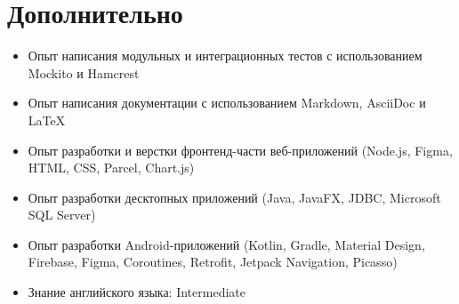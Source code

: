 \documentclass[letterpaper,11pt]{report}
\newcommand{\bulletItem}[1]{\item[$\bullet$] #1}
\begin{document}
\section{Дополнительно}

\begin{itemize}
\bulletItem{Опыт написания модульных и интеграционных тестов с использованием Mockito и Hamcrest}
\bulletItem{Опыт написания документации с использованием Markdown, AsciiDoc и LaTeX}
\bulletItem{Опыт разработки и верстки фронтенд-части веб-приложений (Node.js, Figma, HTML, CSS, Parcel, Chart.js)}
\bulletItem{Опыт разработки десктопных приложений (Java, JavaFX, JDBC, Microsoft SQL Server)}
\bulletItem{Опыт разработки Android-приложений (Kotlin, Gradle, Material Design, Firebase, Figma, Coroutines, Retrofit, Jetpack Navigation, Picasso)}
\bulletItem{Знание английского языка: Intermediate}
\end{itemize}
\end{document}
